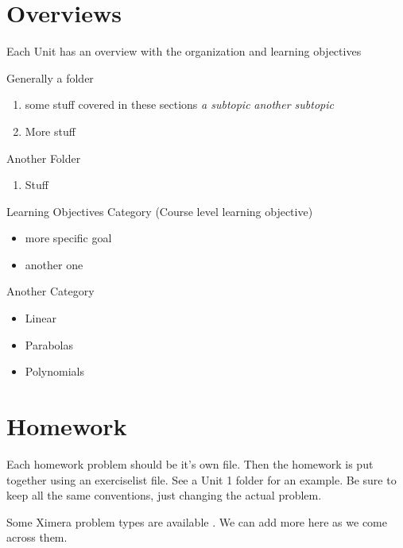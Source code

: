 \documentclass[nooutcomes]{ximera}
\begin{document}

\section{Overviews}

Each Unit has an overview with the organization and learning objectives

\begin{overview}
\item Generally a folder %
	\begin{enumerate}
	\item some stuff covered in these sections
		\textit{a subtopic} 
		\textit{another subtopic} 
	\item More stuff	
	\end{enumerate}	
\item Another Folder 
	\begin{enumerate}	
	\item Stuff 
	\end{enumerate} 
\end{overview}


\begin{objectives}
\item Learning Objectives Category (Course level learning objective)
	\begin{itemize}
	\item more specific goal
	\item another one 
	\end{itemize}
\item Another Category
	\begin{itemize}
	\item Linear 
	\item Parabolas 
	\item Polynomials 
	\end{itemize}
\end{objectives}




\newpage


\section{Homework}
Each homework problem should be it's own file.  Then the homework is put together using an exerciselist file.  See a Unit 1 folder for an example.  Be sure to keep all the same conventions, just changing the actual problem.  

Some Ximera problem types are available .  We can add more here as we come across them.
\end{document}
